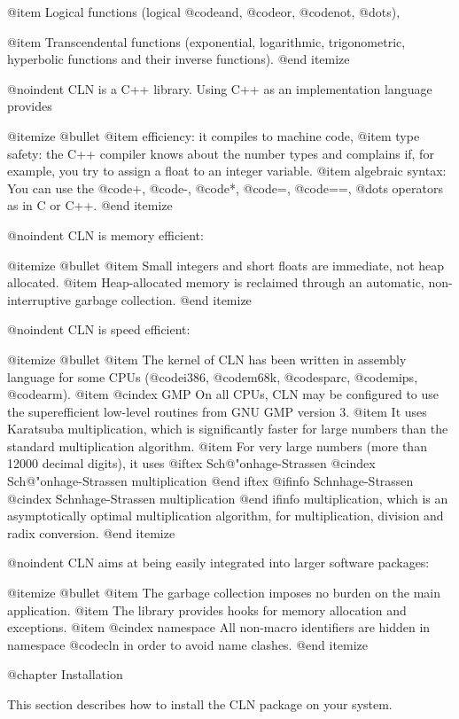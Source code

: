 @item
Logical functions (logical @code{and}, @code{or}, @code{not}, @dots{}),

@item
Transcendental functions (exponential, logarithmic, trigonometric, hyperbolic
functions and their inverse functions).
@end itemize

@noindent
CLN is a C++ library. Using C++ as an implementation language provides

@itemize @bullet
@item
efficiency: it compiles to machine code,
@item
type safety: the C++ compiler knows about the number types and complains
if, for example, you try to assign a float to an integer variable.
@item
algebraic syntax: You can use the @code{+}, @code{-}, @code{*}, @code{=},
@code{==}, @dots{} operators as in C or C++.
@end itemize

@noindent
CLN is memory efficient:

@itemize @bullet
@item
Small integers and short floats are immediate, not heap allocated.
@item
Heap-allocated memory is reclaimed through an automatic, non-interruptive
garbage collection.
@end itemize

@noindent
CLN is speed efficient:

@itemize @bullet
@item
The kernel of CLN has been written in assembly language for some CPUs
(@code{i386}, @code{m68k}, @code{sparc}, @code{mips}, @code{arm}).
@item
@cindex GMP
On all CPUs, CLN may be configured to use the superefficient low-level
routines from GNU GMP version 3.
@item
It uses Karatsuba multiplication, which is significantly faster
for large numbers than the standard multiplication algorithm.
@item
For very large numbers (more than 12000 decimal digits), it uses
@iftex
Sch{@"o}nhage-Strassen
@cindex Sch{@"o}nhage-Strassen multiplication
@end iftex
@ifinfo
Schnhage-Strassen
@cindex Schnhage-Strassen multiplication
@end ifinfo
multiplication, which is an asymptotically optimal multiplication
algorithm, for multiplication, division and radix conversion.
@end itemize

@noindent
CLN aims at being easily integrated into larger software packages:

@itemize @bullet
@item
The garbage collection imposes no burden on the main application.
@item
The library provides hooks for memory allocation and exceptions.
@item
@cindex namespace
All non-macro identifiers are hidden in namespace @code{cln} in 
order to avoid name clashes.
@end itemize


@chapter Installation

This section describes how to install the CLN package on your system.


